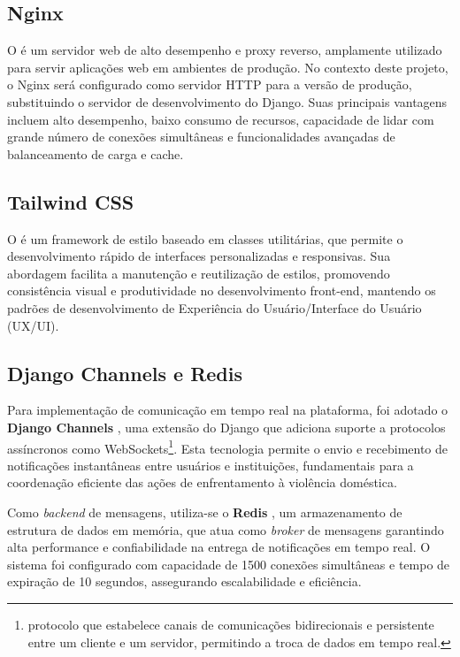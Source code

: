 \subsection{Nginx}
\par O  é um servidor web de alto desempenho e proxy reverso, amplamente utilizado para servir aplicações web em ambientes de produção. No contexto deste projeto, o Nginx será configurado como servidor HTTP para a versão de produção, substituindo o servidor de desenvolvimento do Django. Suas principais vantagens incluem alto desempenho, baixo consumo de recursos, capacidade de lidar com grande número de conexões simultâneas e funcionalidades avançadas de balanceamento de carga e cache.

\subsection{Tailwind CSS}
\par O  é um framework de estilo baseado em classes utilitárias, que permite o desenvolvimento rápido de interfaces personalizadas e responsivas. Sua abordagem facilita a manutenção e reutilização de estilos, promovendo consistência visual e produtividade no desenvolvimento front-end, mantendo os padrões de desenvolvimento de Experiência do Usuário/Interface do Usuário (UX/UI).

\subsection{Django Channels e Redis}
\par Para implementação de comunicação em tempo real na plataforma, foi adotado o \textbf{Django Channels} \cite{django_channels:2025}, uma extensão do Django que adiciona suporte a protocolos assíncronos como WebSockets\footnote{protocolo que estabelece canais de comunicações bidirecionais e persistente entre um cliente e um servidor, permitindo a troca de dados em tempo real.}. Esta tecnologia permite o envio e recebimento de notificações instantâneas entre usuários e instituições, fundamentais para a coordenação eficiente das ações de enfrentamento à violência doméstica.
\par Como \textit{backend} de mensagens, utiliza-se o \textbf{Redis} \cite{redis:2025}, um armazenamento de estrutura de dados em memória, que atua como \textit{broker} de mensagens garantindo alta performance e confiabilidade na entrega de notificações em tempo real. O sistema foi configurado com capacidade de 1500 conexões simultâneas e tempo de expiração de 10 segundos, assegurando escalabilidade e eficiência.

